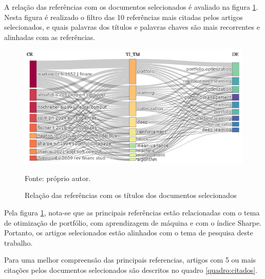         \ipar A relação das referências com os documentos selecionados é avaliado na figura \ref{fig:tree_field_plot}. Nesta figura é realizado o filtro das 10 referências mais citadas pelos artigos selecionados, e quais palavras dos títulos e palavras chaves são mais recorrentes e alinhadas com as referências.

        \begin{figure}[htbp]
            \centering
            \caption{Relação das referências com os títulos dos documentos selecionados}
            \label{fig:tree_field_plot}
            \includegraphics[width=.8\textwidth]{./imagens/tree_field_plot.png}
            \par \footnotesize Fonte: próprio autor.
        \end{figure}

        \ipar Pela figura \ref{fig:tree_field_plot}, nota-se que as principais referências estão relacionadas com o tema de otimização de portfólio, com aprendizagem de máquina e com o índice Sharpe. Portanto, os artigos selecionados estão alinhados com o tema de pesquisa deste trabalho.

        \ipar Para uma melhor compreensão das principais referencias, artigos com 5 ou mais citações pelos documentos selecionados são descritos no quadro \ref{quadro:citados}.


